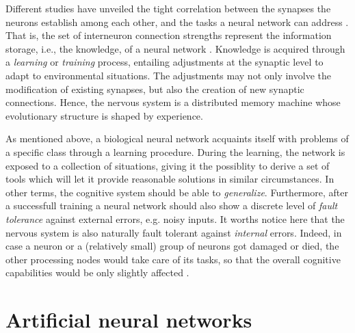 \documentclass[12pt, a4paper, twoside, openright]{report}
\numberwithin{equation}{chapter}
\theoremstyle{theorem}
\theoremstyle{definition}
\theoremstyle{remark}
\theoremstyle{proposition}
\numberwithin{figure}{chapter}
\begin{document}
		 Different studies have unveiled the tight correlation between the synapses the neurons establish among each other, and the tasks a neural network can address \cite{Hag14}. That is, the set of interneuron connection strengths represent the information storage, i.e., the knowledge, of a neural network \cite{Kri}. Knowledge is acquired through a \emph{learning} or \emph{training} process, entailing adjustments at the synaptic level to adapt to environmental situations. The adjustments may not only involve the modification of existing synapses, but also the creation of new synaptic connections. Hence, the nervous system is a distributed memory machine whose evolutionary structure is shaped by experience.
		 
		 As mentioned above, a biological neural network acquaints itself with problems of a specific class through a learning procedure. During the learning, the network is exposed to a collection of situations, giving it the possiblity to derive a set of tools which will let it provide reasonable solutions in similar circumstances. In other terms, the cognitive system should be able to \emph{generalize}. Furthermore, after a successfull training a neural network should also show a discrete level of \emph{fault tolerance} against external errors, e.g. noisy inputs. It worths notice here that the nervous system is also naturally fault tolerant against \emph{internal} errors. Indeed, in case a neuron or a (relatively small) group of neurons got damaged or died, the other processing nodes would take care of its tasks, so that the overall cognitive capabilities would be only slightly affected \cite{Kri}. 
		 
		 
	\vspace*{0.3cm}
		 		
	\section{Artificial neural networks}
	\label{section:Artificial neural networks}
				
\end{document}
